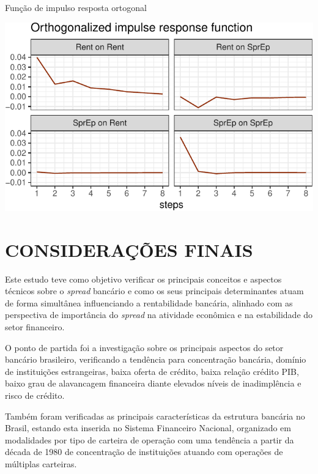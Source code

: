 \documentclass[
  12pt,
  12pt,
  openright,
  oneside,
  a4paper,
  chapter=TITLE,
  section=TITLE,
  subsection=TITLE,
  subsubsection=TITLE,
  english,
  portugues,
  sumario=tradicional]{abntex2}
\begin{document}
\begin{grafico}[!htbp]
\caption{Função de impulso resposta ortogonal}
\vspace{-4mm}

\begin{center}\includegraphics{12-exportedfigures/impulse.plot.orto-1} \end{center}
\vspace{-3mm}
\label{graf:impulseorto}
\vspace{-2mm}
\end{grafico}

\textual
\pagestyle{simple}
\parindent 1.50cm

\chapter{CONSIDERAÇÕES FINAIS}

Este estudo teve como objetivo verificar os principais conceitos e aspectos técnicos sobre o \emph{spread} bancário e como os seus principais determinantes atuam de forma simultânea influenciando a rentabilidade bancária, alinhado com as perspectiva de importância do \emph{spread} na atividade econômica e na estabilidade do setor financeiro.

O ponto de partida foi a investigação sobre os principais aspectos do setor bancário brasileiro, verificando a tendência para concentração bancária, domínio de instituições estrangeiras, baixa oferta de crédito, baixa relação crédito PIB, baixo grau de alavancagem financeira diante elevados níveis de inadimplência e risco de crédito.

Também foram verificadas as principais características da estrutura bancária no Brasil, estando esta inserida no Sistema Financeiro Nacional, organizado em modalidades por tipo de carteira de operação com uma tendência a partir da década de 1980 de concentração de instituições atuando com operações de múltiplas carteiras.
\end{document}
